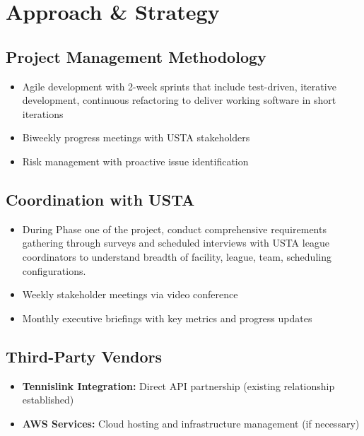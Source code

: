 \section{Approach \& Strategy}

\subsection{Project Management Methodology}
\begin{itemize}
    \item Agile development with 2-week sprints that include test-driven, iterative development, continuous refactoring to deliver working software in short iterations
    \item Biweekly progress meetings with USTA stakeholders
    \item Risk management with proactive issue identification
\end{itemize}

\subsection{Coordination with USTA}
\begin{itemize}
    \item During Phase one of the project, conduct comprehensive requirements gathering through surveys and scheduled interviews with USTA league coordinators to understand breadth of facility, league, team, scheduling configurations. 
    \item Weekly stakeholder meetings via video conference
    \item Monthly executive briefings with key metrics and progress updates
\end{itemize}

\subsection{Third-Party Vendors}
\begin{itemize}
    \item \textbf{Tennislink Integration:} Direct API partnership (existing relationship established)
    \item \textbf{AWS Services:} Cloud hosting and infrastructure management (if necessary)
\end{itemize}


